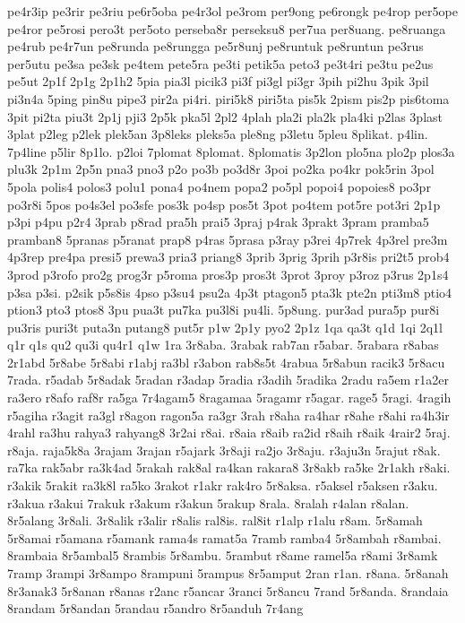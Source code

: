 {pe4r3ip pe3rir pe3riu pe6r5oba pe4r3ol pe3rom per9ong pe6rongk pe4rop
per5ope pe4ror pe5rosi pero3t per5oto perseba8r perseksu8 per7ua per8uang.
pe8ruanga pe4rub pe4r7un pe8runda pe8rungga pe5r8unj pe8runtuk pe8runtun
pe3rus per5utu pe3sa pe3sk pe4tem pete5ra pe3ti petik5a peto3 pe3t4ri
pe3tu pe2us pe5ut 2p1f 2p1g 2p1h2 5pia pia3l picik3 pi3f pi3gl pi3gr 3pih
pi2hu 3pik 3pil pi3n4a 5ping pin8u pipe3 pir2a pi4ri. piri5k8 piri5ta
pis5k 2pism pis2p pis6toma 3pit pi2ta piu3t 2p1j pji3 2p5k pka5l 2pl2
4plah pla2i pla2k pla4ki p2las 3plast 3plat p2leg p2lek plek5an 3p8leks
pleks5a ple8ng p3letu 5pleu 8plikat. p4lin. 7p4line p5lir 8p1lo. p2loi
7plomat 8plomat. 8plomatis 3p2lon plo5na plo2p plos3a plu3k 2p1m 2p5n pna3
pno3 p2o po3b po3d8r 3poi po2ka po4kr pok5rin 3pol 5pola polis4 polos3
polu1 pona4 po4nem popa2 po5pl popoi4 popoies8 po3pr po3r8i 5pos po4s3el
po3sfe pos3k po4sp pos5t 3pot po4tem pot5re pot3ri 2p1p p3pi p4pu p2r4
3prab p8rad pra5h prai5 3praj p4rak 3prakt 3pram pramba5 pramban8 5pranas
p5ranat prap8 p4ras 5prasa p3ray p3rei 4p7rek 4p3rel pre3m 4p3rep pre4pa
presi5 prewa3 pria3 priang8 3prib 3prig 3prih p3r8is pri2t5 prob4 3prod
p3rofo pro2g prog3r p5roma pros3p pros3t 3prot 3proy p3roz p3rus 2p1s4
p3sa p3si. p2sik p5s8is 4pso p3su4 psu2a 4p3t ptagon5 pta3k pte2n pti3m8
ptio4 ption3 pto3 ptos8 3pu pua3t pu7ka pu3l8i pu4li. 5p8ung. pur3ad
pura5p pur8i pu3ris puri3t puta3n putang8 put5r p1w 2p1y pyo2 2p1z 1qa
qa3t q1d 1qi 2q1l q1r q1s qu2 qu3i qu4r1 q1w 1ra 3r8aba. 3rabak rab7an
r5abar. 5rabara r8abas 2r1abd 5r8abe 5r8abi r1abj ra3bl r3abon rab8s5t
4rabua 5r8abun racik3 5r8acu 7rada. r5adab 5r8adak 5radan r3adap 5radia
r3adih 5radika 2radu ra5em r1a2er ra3ero r8afo raf8r ra5ga 7r4agam5
8ragamaa 5ragamr r5agar. rage5 5ragi. 4ragih r5agiha r3agit ra3gl r8agon
ragon5a ra3gr 3rah r8aha ra4har r8ahe r8ahi ra4h3ir 4rahl ra3hu rahya3
rahyang8 3r2ai r8ai. r8aia r8aib ra2id r8aih r8aik 4rair2 5raj. r8aja.
raja5k8a 3rajam 3rajan r5ajark 3r8aji ra2jo 3r8aju. r3aju3n 5rajut r8ak.
ra7ka rak5abr ra3k4ad 5rakah rak8al ra4kan rakara8 3r8akb ra5ke 2r1akh
r8aki. r3akik 5rakit ra3k8l ra5ko 3rakot r1akr rak4ro 5r8aksa. r5aksel
r5aksen r3aku. r3akua r3akui 7rakuk r3akum r3akun 5rakup 8rala. 8ralah
r4alan r8alan. 8r5alang 3r8ali. 3r8alik r3alir r8alis ral8is. ral8it r1alp
r1alu r8am. 5r8amah 5r8amai r5amana r5amank rama4s ramat5a 7ramb ramba4
5r8ambah r8ambai. 8rambaia 8r5ambal5 8rambis 5r8ambu. 5rambut r8ame
ramel5a r8ami 3r8amk 7ramp 3rampi 3r8ampo 8rampuni 5rampus 8r5amput 2ran
r1an. r8ana. 5r8anah 8r3anak3 5r8anan r8anas r2anc r5ancar 3ranci 5r8ancu
7rand 5r8anda. 8randaia 8randam 5r8andan 5randau r5andro 8r5anduh 7r4ang
}

